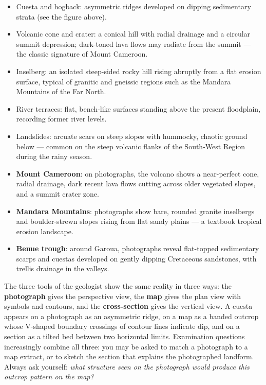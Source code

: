 \documentclass[11pt]{article}
\newcommand{\cle}[1]{{\popxbold\color{popdark}#1}}
\newcounter{popsec}
\newcounter{popsub}
\newcommand{\courssub}[1]{%
  \stepcounter{popsub}%
  \par\vspace{9pt}\noindent{\popxbold\fontsize{11.5}{13}\selectfont\color{popink}{\color{poporange}\thepopsec.\thepopsub}\hspace{6pt}#1}\par\nopagebreak\vspace{4pt}
}
\begin{document}
\begin{itemize}
\item \cle{Cuesta} and \cle{hogback}: asymmetric ridges developed on dipping sedimentary strata (see the figure above).
\item \cle{Volcanic cone and crater}: a conical hill with radial drainage and a circular summit depression; dark-toned lava flows may radiate from the summit — the classic signature of \cle{Mount Cameroon}.
\item \cle{Inselberg}: an isolated steep-sided rocky hill rising abruptly from a flat erosion surface, typical of granitic and gneissic regions such as the \cle{Mandara Mountains} of the Far North.
\item \cle{River terraces}: flat, bench-like surfaces standing above the present floodplain, recording former river levels.
\item \cle{Landslides}: arcuate scars on steep slopes with hummocky, chaotic ground below — common on the steep volcanic flanks of the South-West Region during the rainy season.
\end{itemize}

\begin{savaistu}
\begin{itemize}
\item \textbf{Mount Cameroon}: on photographs, the volcano shows a near-perfect cone, radial drainage, dark recent lava flows cutting across older vegetated slopes, and a summit crater zone.
\item \textbf{Mandara Mountains}: photographs show bare, rounded granite inselbergs and boulder-strewn slopes rising from flat sandy plains — a textbook tropical erosion landscape.
\item \textbf{Benue trough}: around Garoua, photographs reveal flat-topped sedimentary scarps and cuestas developed on gently dipping Cretaceous sandstones, with trellis drainage in the valleys.
\end{itemize}
\end{savaistu}

\courssub{Linking Photograph, Map and Section}

The three tools of the geologist show the same reality in three ways: the \textbf{photograph} gives the perspective view, the \textbf{map} gives the plan view with symbols and contours, and the \textbf{cross-section} gives the vertical view. A cuesta appears on a photograph as an asymmetric ridge, on a map as a banded outcrop whose V-shaped boundary crossings of contour lines indicate dip, and on a section as a tilted bed between two horizontal limits. Examination questions increasingly combine all three: you may be asked to match a photograph to a map extract, or to sketch the section that explains the photographed landform. Always ask yourself: \emph{what structure seen on the photograph would produce this outcrop pattern on the map?}
\end{document}
